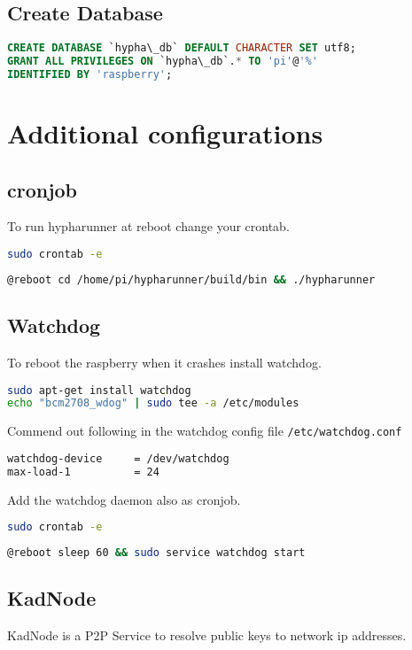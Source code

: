 \documentclass[german,a4paper,11pt]{report}
\begin{document}
\section{Create Database}
\begin{lstlisting}[language=sql,caption={create database}]
CREATE DATABASE `hypha\_db` DEFAULT CHARACTER SET utf8;
GRANT ALL PRIVILEGES ON `hypha\_db`.* TO 'pi'@'%'
IDENTIFIED BY 'raspberry';
\end{lstlisting}

\chapter{Additional configurations}
\section{cronjob}
To run hypharunner at reboot change your crontab.
\begin{lstlisting}[language=bash]
sudo crontab -e
\end{lstlisting}
\begin{lstlisting}[language=bash,caption={crontab}]
@reboot cd /home/pi/hypharunner/build/bin && ./hypharunner
\end{lstlisting}

\section{Watchdog}
To reboot the raspberry when it crashes install watchdog.
\begin{lstlisting}[language=bash,caption={watchdog}]
sudo apt-get install watchdog
echo "bcm2708_wdog" | sudo tee -a /etc/modules
\end{lstlisting}
Commend out following in the watchdog config file \texttt{/etc/watchdog.conf}
\begin{lstlisting}[language=bash,caption={/etc/watchdog.conf}]
watchdog-device		= /dev/watchdog
max-load-1			= 24
\end{lstlisting}
Add the watchdog daemon also as cronjob.
\begin{lstlisting}[language=bash]
sudo crontab -e
\end{lstlisting}
\begin{lstlisting}[language=bash,caption={crontab}]
@reboot sleep 60 && sudo service watchdog start
\end{lstlisting}

\section{KadNode}
KadNode is a P2P Service to resolve public keys to network ip addresses.
\end{document}

